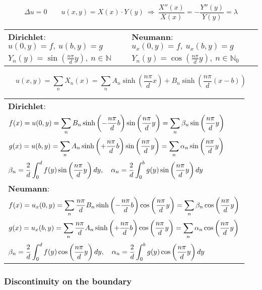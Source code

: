 \documentclass[a4paper]{article}
\begin{document}
\begin{twocolumn}
$$\Delta u = 0 \qquad u(x,y) = X(x) \cdot Y(y) \ \Rightarrow \ \frac{X''(x)}{X(x)} = - \frac{Y''(y)}{Y(y)} = \lambda$$

\begin{tabular}{C{.47\columnwidth}|C{.5\columnwidth}}
	\textbf{Dirichlet}:	$u(0,y) = f, \ u(b,y) = g$ & \textbf{Neumann}: $u_x(0,y) = f, \ u_x(b,y) = g$ \\
	$Y_n(y) = \sin\left(\frac{n\pi}{d} y\right), \ n \in \mathbb{N}$ &
	$Y_n(y) = \cos\left(\frac{n\pi}{d} y\right), \ n \in \mathbb{N}_0 $ \\
\end{tabular}

$$u(x,y) = \sum_n X_n(x) = \sum_n A_n \sinh\left(\frac{n\pi}{d} x\right) + B_n \sinh\left(\frac{n\pi}{d} (x-b)\right)$$

{\footnotesize
\begin{tabular}{C{.95\columnwidth}}
	\textbf{Dirichlet}:\\
	$\displaystyle f(x) = u(0,y) = \sum_n B_n \sinh\left(-\frac{n\pi}{d} b\right) \sin\left(\frac{n\pi}{d} y\right) = \sum_n \beta_n \sin\left(\frac{n\pi}{d} y\right)$ \\
	$\displaystyle g(x) = u(b,y) = \sum_n A_n \sinh\left(+\frac{n\pi}{d} b\right) \sin\left(\frac{n\pi}{d} y\right) = \sum_n \alpha_n \sin\left(\frac{n\pi}{d} y\right)$ \\
	$\displaystyle \beta_n = \frac{2}{d} \int_{0}^{d} f(y) \sin\left(\frac{n\pi}{d} y\right) dy, \quad \alpha_n = \frac{2}{d} \int_0^b g(y) \sin\left(\frac{n\pi}{d} y\right)dy$ \\ \midrule
	\textbf{Neumann}: \\
	$\displaystyle f(x) = u_x(0,y) = \sum_n \frac{n\pi}{d} B_n \sinh\left(-\frac{n\pi}{d} b\right) \cos\left(\frac{n\pi}{d} y\right) = \sum_n \beta_n \cos\left(\frac{n\pi}{d} y\right)$ \\
	$\displaystyle g(x) = u_x(b,y) = \sum_n \frac{n\pi}{d} A_n \sinh\left(+\frac{n\pi}{d} b\right) \cos\left(\frac{n\pi}{d} y\right) = \sum_n \alpha_n \cos\left(\frac{n\pi}{d} y\right)$ \\
	$\displaystyle \beta_n = \frac{2}{d} \int_{0}^{d} f(y) \cos\left(\frac{n\pi}{d} y\right) dy, \quad \alpha_n = \frac{2}{d} \int_0^b g(y) \cos\left(\frac{n\pi}{d} y\right)dy$ \\ 
	
\end{tabular}
}

\subsubsection{Discontinuity on the boundary}


\end{twocolumn}
\end{document}
